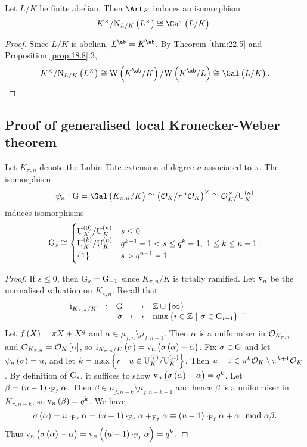 \begin{corollary}
Let $ L / K $ be finite abelian. Then $ \Art_K $ induces an isomorphism
$$ K^\times / \N_{L / K}\br{L^\times} \cong \Gal\br{L / K}. $$
\end{corollary}

\begin{proof}
Since $ L / K $ is abelian, $ L^{\ab} = K^{\ab} $. By Theorem \ref{thm:22.5} and Proposition \ref{prop:18.8}.$ 3 $,
$$ K^\times / \N_{L / K}\br{L^\times} \cong \W\br{K^{\ab} / K} / \W\br{K^{\ab} / L} \cong \Gal\br{L / K}. $$
\end{proof}

\subsection{Proof of generalised local Kronecker-Weber theorem}


\begin{proposition}
Let $ K_{\pi, n} $ denote the Lubin-Tate extension of degree $ n $ associated to $ \pi $. The isomorphism
$$ \psi_n : \G = \Gal\br{K_{\pi, n} / K} \cong \br{\OOO_K / \pi^n\OOO_K}^\times \cong \OOO_K^\times / \U_K^{\br{n}} $$
induces isomorphisms
$$ \G_s \cong
\begin{cases}
\U_K^{\br{0}} / \U_K^{\br{n}} & s \le 0 \\
\U_K^{\br{k}} / \U_K^{\br{n}} & q^{k - 1} - 1 < s \le q^k - 1, \ 1 \le k \le n - 1 \\
\cbr{1} & s > q^{n - 1} - 1
\end{cases}.
$$
\end{proposition}

\begin{proof}
If $ s \le 0 $, then $ \mathrm{G}_s = \mathrm{G}_{-1} $ since $ K_{\pi, n} / K $ is totally ramified. Let $ \mathrm{v}_n $ be the normalised valuation on $ K_{\pi, n} $. Recall that
$$ \function[\i_{K_{\pi, n} / K}]{\G}{\ZZ \cup \cbr{\infty}}{\sigma}{\max \cbr{i \in \ZZ \st \sigma \in \G_{i - 1}}}. $$
Let $ f\br{X} = \pi X + X^q $ and $ \alpha \in \mu_{f, n} \setminus \mu_{f, n - 1} $. Then $ \alpha $ is a uniformiser in $ \mathcal{O}_{K_{\pi, n}} $ and $ \OOO_{K_{\pi, n}} = \OOO_K\sbr{\alpha} $, so $ \i_{K_{\pi, n} / K}\br{\sigma} = \v_n\br{\sigma\br{\alpha} - \alpha} $. Fix $ \sigma \in \mathrm{G} $ and let $ \psi_n\br{\sigma} = u $, and let $ k = \max \cbr{r \st u \in \U_K^{\br{r}} / \U_K^{\br{n}}} $. Then $ u - 1 \in \pi^k\mathcal{O}_K \setminus \pi^{k + 1}\mathcal{O}_K $. By definition of $ \mathrm{G}_s $, it suffices to show $ \v_n\br{\sigma\br{\alpha} - \alpha} = q^k $. Let $ \beta = \br{u - 1} \cdot_{\F_f} \alpha $. Then $ \beta \in \mu_{f, n - k} \setminus \mu_{f, n - k - 1} $ and hence $ \beta $ is a uniformiser in $ K_{\pi, n - k} $, so $ \v_n\br{\beta} = q^k $. We have
$$ \sigma\br{\alpha} = u \cdot_{\F_f} \alpha = \br{u - 1} \cdot_{\F_f} \alpha +_{\F_f} \alpha \equiv \br{u - 1} \cdot_{\F_f} \alpha + \alpha \mod \alpha\beta. $$
Thus $ \v_n\br{\sigma\br{\alpha} - \alpha} = \v_n\br{\br{u - 1} \cdot_{\F_f} \alpha} = q^k $.
\end{proof}

